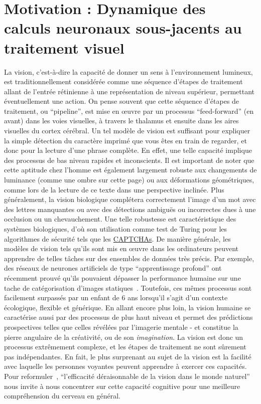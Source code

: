 \documentclass[11pt,french,a4paper,oneside]{article}%
\begin{document}
\section{Motivation : Dynamique des calculs neuronaux
sous-jacents au traitement
visuel}
La vision, c'est-à-dire la capacité de donner un sens à l'environnement
lumineux, est traditionnellement considérée comme une séquence d'étapes
de traitement allant de l'entrée rétinienne à une représentation de
niveau supérieur, permettant éventuellement une action. On pense souvent que cette séquence d'étapes de
traitement, ou ``pipeline'', est mise en œuvre par un
processus ``feed-forward'' (en avant) dans les voies visuelles, à travers le thalamus
et ensuite dans les aires visuelles du cortex cérébral. Un tel modèle de
vision est suffisant pour expliquer la simple détection du caractère
imprimé que vous êtes en train de regarder, et donc pour la lecture
d'une phrase complète. En effet, une telle capacité implique des
processus de bas niveau rapides et inconscients. Il est important de
noter que cette aptitude chez l'homme est également largement robuste
aux changements de luminance (comme une ombre sur cette page) ou
aux déformations géométriques, comme lors de la lecture de ce
texte dans une perspective inclinée. Plus généralement, la vision biologique
complétera correctement l'image d'un mot avec des lettres manquantes ou
avec des détections ambiguës ou incorrectes dues à une occlusion ou un
chevauchement. Une telle robustesse est caractéristique des systèmes
biologiques, d'où son utilisation comme test de Turing pour les
algorithmes de sécurité tels que les
\href{https://fr.m.wikipedia.org/wiki/CAPTCHA}{CAPTCHAs}.
De manière générale, les modèles de vision tels qu'ils sont mis en œuvre dans les ordinateurs
peuvent apprendre de telles tâches sur des
ensembles de données très précis.
Par exemple, des réseaux de neurones artificiels de type ``apprentissage profond'' ont récemment prouvé qu'ils pouvaient dépasser la performance humaine sur une tache de catégorisation d'images statiques~\citep{NIPS2012_4824}. %
Toutefois, ces mêmes processus sont facilement surpassés par un
enfant de 6 ans lorsqu'il s'agit d'un contexte écologique, flexible et
générique. En allant encore plus loin, la vision humaine se caractérise
aussi par des processus de plus haut niveau et permet des prédictions
prospectives telles que celles révélées par l'imagerie mentale - et
constitue la pierre angulaire de la créativité, ou de
son \emph{imagination}. La vision est donc un processus
extrêmement complexe, et les étapes de traitement ne sont sûrement pas indépendantes. %
En fait, le plus surprenant au sujet de la vision est la
facilité avec laquelle les personnes voyantes peuvent apprendre à exercer ces
capacités. Pour reformuler~\citet{Wigner90}, ``l'efficacité déraisonnable de
la vision dans le monde naturel'' nous invite à nous concentrer sur cette
capacité cognitive pour une meilleure compréhension du cerveau en
général.
\end{document}
